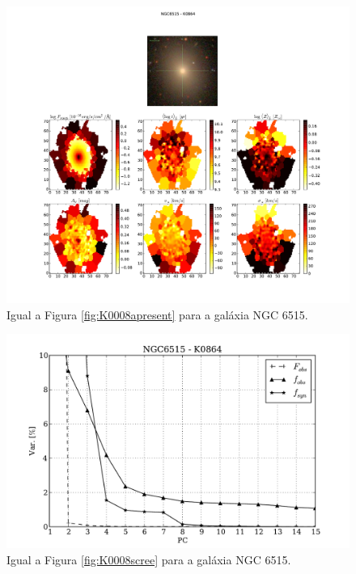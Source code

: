\begin{figure}
    \includegraphics[width=1.\textwidth]{figuras/K0864-apresent.pdf}
    \caption[Propriedades f\'isicas da gal\'axia NGC 6515.]
    {Igual a Figura \ref{fig:K0008apresent} para a galáxia NGC 6515.}
    \label{fig:K0864apresent}
\end{figure}

\begin{figure}
    \includegraphics[height=0.33\textheight]{figuras/K0864-screetest.pdf}
    \caption[Scree test comparativo entre 3 PCAs - NGC 6515.]
	{Igual a Figura \ref{fig:K0008scree} para a galáxia NGC 6515.}
    \label{fig:K0864scree}
\end{figure}

